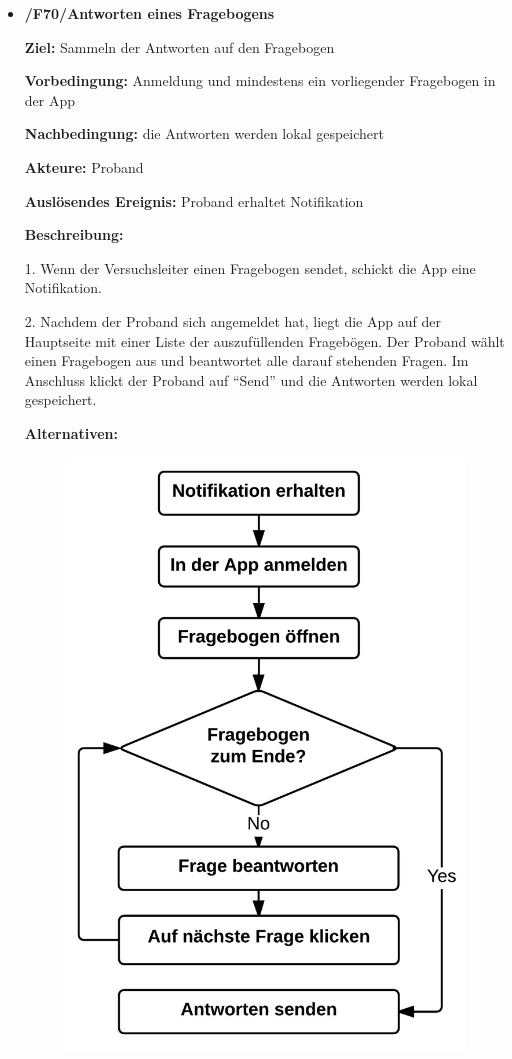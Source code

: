 \documentclass[a4paper]{scrreprt}
\begin{document}
\begin{itemize}
            \item \textbf{/F70/Antworten eines Fragebogens}

            	\par \textbf{Ziel: }Sammeln der Antworten auf den Fragebogen
            	\par \textbf{Vorbedingung: }Anmeldung und mindestens ein vorliegender Fragebogen in der App
            	\par \textbf{Nachbedingung: }die Antworten werden lokal gespeichert
            	\par \textbf{Akteure: }Proband
            	\par \textbf{Auslösendes Ereignis: }Proband erhaltet Notifikation
            	\par \textbf{Beschreibung: }
            	\par 1. Wenn der Versuchsleiter einen Fragebogen sendet, schickt die App eine Notifikation.
            	\par 2. Nachdem der Proband sich angemeldet hat, liegt die App auf der Hauptseite mit einer Liste der auszufüllenden Fragebögen. Der Proband wählt einen Fragebogen aus und beantwortet alle darauf stehenden Fragen. Im Anschluss klickt der Proband auf ``Send'' und die Antworten werden lokal gespeichert.
            	\par \textbf{Alternativen: }
            	\begin{figure}[ht]
            		\centering
            		\includegraphics[scale=0.5]{AppAntworten.jpeg}

\end{figure}
\end{itemize}
\end{document}
